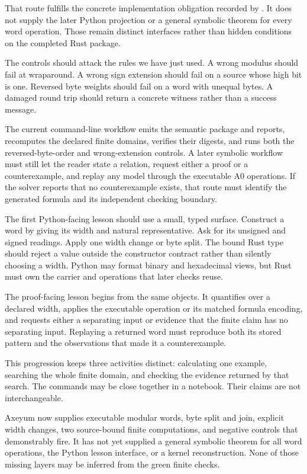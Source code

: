 That route fulfills the concrete implementation obligation recorded by
. It does not supply the later Python projection or a
general symbolic theorem for every word operation. Those remain distinct
interfaces rather than hidden conditions on the completed Rust package.

The controls should attack the rules we have just used. A wrong modulus should
fail at wraparound. A wrong sign extension should fail on a source whose high
bit is one. Reversed byte weights should fail on a word with unequal bytes.
A damaged round trip should return a concrete witness rather than a success
message.

The current command-line workflow emits the semantic package and reports,
recomputes the declared finite domains, verifies their digests, and runs both
the reversed-byte-order and wrong-extension controls. A later symbolic
workflow must still let the reader state a relation, request either a proof or
a counterexample, and replay any model through the executable A0 operations.
If the solver reports that no counterexample exists, that route must identify
the generated formula and its independent checking boundary.

The first Python-facing lesson should use a small, typed surface. Construct a
word by giving its width and natural representative. Ask for its unsigned and
signed readings. Apply one width change or byte split. The bound Rust type
should reject a value outside the constructor contract rather than silently
choosing a width. Python may format binary and hexadecimal views, but Rust
must own the carrier and operations that later checks reuse.

The proof-facing lesson begins from the same objects. It quantifies over a
declared width, applies the executable operation or its matched formula
encoding, and requests either a separating input or evidence that the finite
claim has no separating input. Replaying a returned word must reproduce both
its stored pattern and the observations that made it a counterexample.

This progression keeps three activities distinct: calculating one example,
searching the whole finite domain, and checking the evidence returned by that
search. The commands may be close together in a notebook. Their claims are
not interchangeable.

\begin{sidebar}[title={What Axeyum has established, and what remains}]
Axeyum now supplies executable modular words, byte split and join, explicit
width changes, two source-bound finite computations, and negative controls
that demonstrably fire. It has not yet supplied a general symbolic theorem for
all word operations, the Python lesson interface, or a kernel reconstruction.
None of those missing layers may be inferred from the green finite checks.
\end{sidebar}

